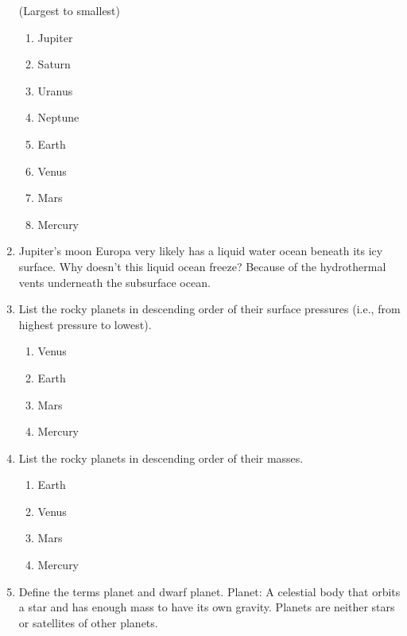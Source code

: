 \documentclass[12pt]{article}
\begin{document}
\begin{enumerate}
        \newline\newline
        (Largest to smallest)
        \begin{enumerate}
            \item Jupiter
            \item Saturn
            \item Uranus
            \item Neptune
            \item Earth
            \item Venus
            \item Mars
            \item Mercury
        \end{enumerate}
    \item Jupiter’s moon Europa very likely has a liquid water ocean beneath its icy surface. Why doesn’t this liquid ocean freeze?
        \newline\newline
        Because of the hydrothermal vents underneath the subsurface ocean.
    \item List the rocky planets in descending order of their surface pressures (i.e., from highest pressure to lowest).
        \begin{enumerate}
            \item Venus
            \item Earth
            \item Mars
            \item Mercury
        \end{enumerate}
    \item List the rocky planets in descending order of their masses.
        \begin{enumerate}
            \item Earth %
            \item Venus  %
            \item Mars %
            \item Mercury  %
        \end{enumerate}
    \item Define the terms planet and dwarf planet.\newline\newline
        Planet: A celestial body that orbits a star and has enough mass to have its own gravity. Planets are neither stars or satellites of other planets.\newline\newline

\end{enumerate}
\end{document}
